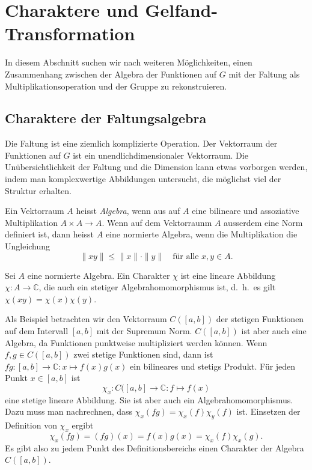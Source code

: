 %
%
%
\section{Charaktere und Gelfand-Transformation
\label{buch:gruppen:section:gelfand}}
In diesem Abschnitt suchen wir nach weiteren Möglichkeiten, einen
Zusammenhang zwischen der Algebra der Funktionen auf $G$ mit der Faltung
als Multiplikationsoperation und der Gruppe zu rekonstruieren.

%
%
\subsection{Charaktere der Faltungsalgebra}
Die Faltung ist eine ziemlich komplizierte Operation.
Der Vektorraum der Funktionen auf $G$ ist ein unendlichdimensionaler
Vektorraum.
Die Unübersichtlichkeit der Faltung und die Dimension kann etwas
vorborgen werden, indem man komplexwertige Abbildungen untersucht,
die möglichst viel der Struktur erhalten.

\begin{definition}
Ein Vektorraum $A$ heisst {\em Algebra}, wenn aus auf $A$ eine bilineare
und assoziative Multiplikation $A\times A\to A$.
Wenn auf dem Vektorraunm $A$ ausserdem eine Norm definiert ist, dann
heisst $A$ eine normierte Algebra, wenn die Multiplikation die
Ungleichung
\[
\| xy \| \le \|x\|\cdot \|y\|\quad\text{für alle $x,y\in A$}.
\]
\end{definition}

\begin{definition}
Sei $A$ eine normierte Algebra.
Ein Charakter $\chi$ ist eine lineare Abbildung $\chi\colon A\to\mathbb{C}$,
die auch ein stetiger Algebrahomomorphismus ist, d.~h.~es gilt
$\chi(xy)=\chi(x)\chi(y)$.
\end{definition}

Als Beispiel betrachten wir den Vektorraum $C([a,b])$ der stetigen Funktionen
auf dem Intervall $[a,b]$ mit der Supremum Norm.
$C([a,b])$ ist aber auch eine Algebra, da Funktionen punktweise
multipliziert werden können.
Wenn $f,g\in C([a,b])$ zwei stetige Funktionen sind, dann ist
$fg\colon [a,b]\to\mathbb{C}:x\mapsto f(x)g(x)$ ein bilineares und
stetigs Produkt.
Für jeden Punkt $x\in[a,b]$ ist
\[
\chi_x
\colon
C([a,b] \to \mathbb{C}
:
f\mapsto f(x)
\]
eine stetige lineare Abbildung.
Sie ist aber auch ein Algebrahomomorphismus.
Dazu muss man nachrechnen, dass $\chi_x(fg)=\chi_x(f)\chi_y(f)$ ist.
Einsetzen der Definition von $\chi_x$ ergibt
\[
\chi_x(fg)
=
(fg)(x)
=
f(x)g(x)
=
\chi_x(f)\chi_x(g).
\]
Es gibt also zu jedem Punkt des Definitionsbereichs einen Charakter
der Algebra $C([a,b])$.

